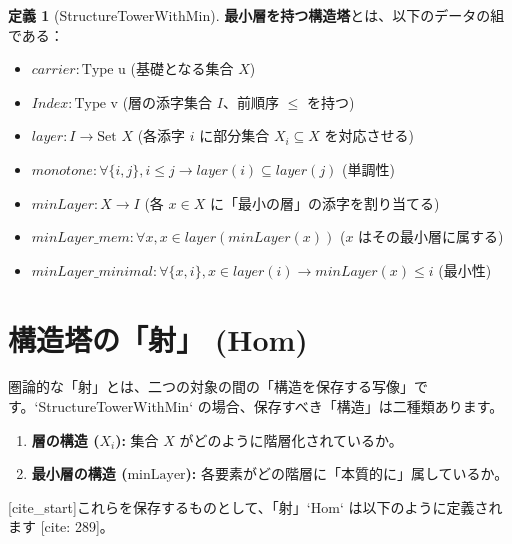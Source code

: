 \documentclass[11pt]{ltjsarticle}
\def\texttt#1{#1}%
\theoremstyle{definition}
\newtheorem{definition}{定義}[section]
\theoremstyle{plain}
\theoremstyle{remark}
\begin{document}
\begin{definition}[StructureTowerWithMin]
\textbf{最小層を持つ構造塔}とは、以下のデータの組である：
\begin{itemize}
    \item $\texttt{carrier}: \text{Type u}$ (基礎となる集合 $X$)
    \item $\texttt{Index}: \text{Type v}$ (層の添字集合 $I$、前順序 $\le$ を持つ)
    \item $\texttt{layer}: I \to \text{Set } X$ (各添字 $i$ に部分集合 $X_i \subseteq X$ を対応させる)
    \item $\texttt{monotone}: \forall \{i, j\}, i \le j \to \texttt{layer}(i) \subseteq \texttt{layer}(j)$ (単調性)
    \item $\texttt{minLayer}: X \to I$ (各 $x \in X$ に「最小の層」の添字を割り当てる)
    \item $\texttt{minLayer\_mem}: \forall x, x \in \texttt{layer}(\texttt{minLayer}(x))$ ($x$ はその最小層に属する)
    \item $\texttt{minLayer\_minimal}: \forall \{x, i\}, x \in \texttt{layer}(i) \to \texttt{minLayer}(x) \le i$ (最小性)
\end{itemize}
\end{definition}

\section{構造塔の「射」 (Hom)}

圏論的な「射」とは、二つの対象の間の「構造を保存する写像」です。`StructureTowerWithMin` の場合、保存すべき「構造」は二種類あります。
\begin{enumerate}
    \item \textbf{層の構造 ($X_i$):} 集合 $X$ がどのように階層化されているか。
    \item \textbf{最小層の構造 ($\text{minLayer}$):} 各要素がどの階層に「本質的に」属しているか。
\end{enumerate}
[cite_start]これらを保存するものとして、「射」`Hom` は以下のように定義されます [cite: 289]。
\end{document}
